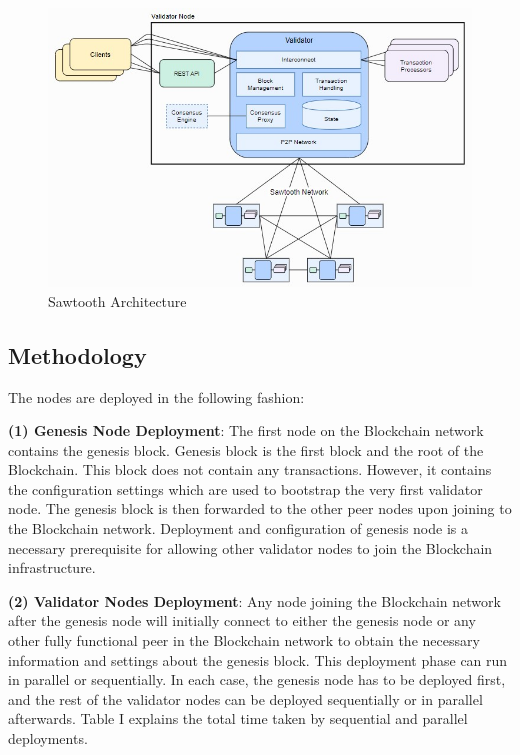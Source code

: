 \begin{figure}[!ht] %
    \centering
    \setlength{\belowcaptionskip}{-10pt}
    \includegraphics[width=5in]{figs/sawtooth_arch.png}
    \caption{Sawtooth Architecture \cite{sawtooth-architecture-guide}}
    \label{fig:Sawtooth_Architecture} %
\end{figure}

\subsection{Methodology}
The nodes are deployed in the following fashion:

\textbf{(1) Genesis Node Deployment}: The first node on the Blockchain network contains the genesis block. Genesis block is the first block and the root of the Blockchain. This block does not contain any transactions. However, it contains the configuration settings which are used to bootstrap the very first validator node. The genesis block is then forwarded to the other peer nodes upon joining to the Blockchain network. Deployment and configuration of genesis node is a necessary prerequisite for allowing other validator nodes to join the Blockchain infrastructure.

\textbf{(2) Validator Nodes Deployment}: Any node joining the Blockchain network after the genesis node will initially connect to either the genesis node or any other fully functional peer in the Blockchain network to obtain the necessary information and settings about the genesis block. This deployment phase can run in parallel or sequentially. In each case, the genesis node has to be deployed first, and the rest of the validator nodes can be deployed sequentially or in parallel afterwards. Table I explains the total time taken by sequential and parallel deployments.

